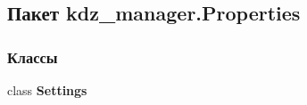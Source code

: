 \subsection{Пакет kdz\+\_\+manager.\+Properties}
\label{namespacekdz__manager_1_1_properties}
\subsubsection*{Классы}
\begin{DoxyCompactItemize}
\item 
class {\bfseries Settings}
\end{DoxyCompactItemize}

